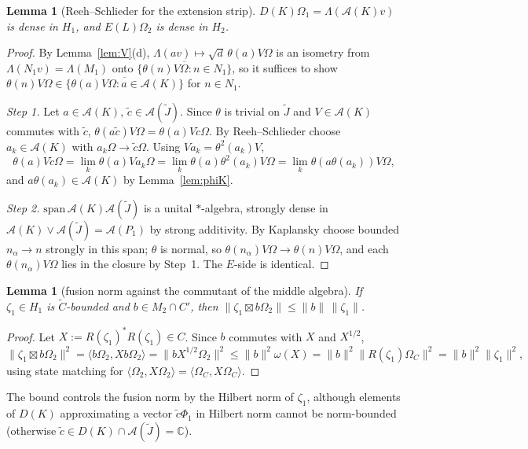 \documentclass[11pt]{article}
\newtheorem{lemma}[theorem]{Lemma}
\theoremstyle{definition}
\theoremstyle{remark}
\newcommand{\cA}{\mathcal A}
\newcommand{\Om}{\Omega}
\newcommand{\Lam}{\Lambda}
\newcommand{\fus}{\boxtimes}
\newcommand{\ip}[2]{\langle #1,#2\rangle}
\begin{document}
\begin{lemma}[Reeh--Schlieder for the extension strip]\label{lem:RS}
$D(K)\Om_1=\Lam(\cA(K)v)$ is dense in $H_1$, and $E(L)\Om_2$ is dense in $H_2$.
\end{lemma}
\begin{proof}
By Lemma~\ref{lem:V}(d), $\Lam(av)\mapsto\sqrt d\,\theta(a)V\Om$ is an isometry from $\Lam(N_1v)=\Lam(M_1)$ onto $\overline{\{\theta(n)V\Om:n\in N_1\}}$, so it suffices to show $\theta(n)V\Om\in\overline{\{\theta(a)V\Om:a\in\cA(K)\}}$ for $n\in N_1$.

\emph{Step 1.} Let $a\in\cA(K)$, $\tilde c\in\cA(\tilde J)$. Since $\theta$ is trivial on $\tilde J$ and $V\in\cA(K)$ commutes with $\tilde c$, $\theta(a\tilde c)V\Om=\theta(a)V\tilde c\Om$. By Reeh--Schlieder choose $a_k\in\cA(K)$ with $a_k\Om\to\tilde c\Om$. Using $Va_k=\theta^2(a_k)V$,
\[
\theta(a)V\tilde c\Om=\lim_k\theta(a)Va_k\Om=\lim_k\theta(a)\theta^2(a_k)V\Om=\lim_k\theta(a\theta(a_k))V\Om,
\]
and $a\theta(a_k)\in\cA(K)$ by Lemma~\ref{lem:phiK}.

\emph{Step 2.} $\mathrm{span}\,\cA(K)\cA(\tilde J)$ is a unital $*$-algebra, strongly dense in $\cA(K)\vee\cA(\tilde J)=\cA(P_1)$ by strong additivity. By Kaplansky choose bounded $n_\alpha\to n$ strongly in this span; $\theta$ is normal, so $\theta(n_\alpha)V\Om\to\theta(n)V\Om$, and each $\theta(n_\alpha)V\Om$ lies in the closure by Step~1. The $E$-side is identical.
\end{proof}

\begin{lemma}[fusion norm against the commutant of the middle algebra]\label{lem:fusionbound}
If $\zeta_1\in H_1$ is $\tilde C$-bounded and $b\in M_2\cap C'$, then $\|\zeta_1\fus b\Om_2\|\le\|b\|\,\|\zeta_1\|$.
\end{lemma}
\begin{proof}
Let $X:=R(\zeta_1)^*R(\zeta_1)\in C$. Since $b$ commutes with $X$ and $X^{1/2}$,
\[
\|\zeta_1\fus b\Om_2\|^2=\ip{b\Om_2}{Xb\Om_2}=\|bX^{1/2}\Om_2\|^2\le\|b\|^2\omega(X)=\|b\|^2\|R(\zeta_1)\Om_C\|^2=\|b\|^2\|\zeta_1\|^2,
\]
using state matching for $\ip{\Om_2}{X\Om_2}=\ip{\Om_C}{X\Om_C}$.
\end{proof}
The bound controls the fusion norm by the Hilbert norm of $\zeta_1$, although elements of $D(K)$ approximating a vector $\tilde c\Phi_1$ in Hilbert norm cannot be norm-bounded (otherwise $\tilde c\in D(K)\cap\cA(\tilde J)=\mathbb C$).
\end{document}
